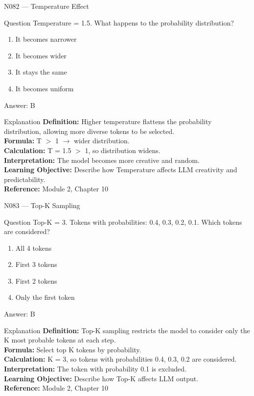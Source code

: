 \documentclass[aspectratio=169,8pt]{beamer}
\begin{document}
	\begin{frame}{N082 --- Temperature Effect}
		\begin{block}{Question}
			Temperature = 1.5. What happens to the probability distribution?
			\begin{enumerate}
				\item It becomes narrower
				\item It becomes wider
				\item It stays the same
				\item It becomes uniform
			\end{enumerate}
		\end{block}
		\begin{exampleblock}{Answer: B}\end{exampleblock}
		\begin{block}{Explanation}
			\textbf{Definition:} Higher temperature flattens the probability distribution, allowing more diverse tokens to be selected.\\
			\textbf{Formula:} T $>$ 1 $\rightarrow$ wider distribution.\\
			\textbf{Calculation:} T = 1.5 $>$ 1, so distribution widens.\\
			\textbf{Interpretation:} The model becomes more creative and random.\\
			\textbf{Learning Objective:} Describe how Temperature affects LLM creativity and predictability.\\
			\textbf{Reference:} Module 2, Chapter 10
		\end{block}
	\end{frame}
	
	\begin{frame}{N083 --- Top-K Sampling}
		\begin{block}{Question}
			Top-K = 3. Tokens with probabilities: 0.4, 0.3, 0.2, 0.1. Which tokens are considered?
			\begin{enumerate}
				\item All 4 tokens
				\item First 3 tokens
				\item First 2 tokens
				\item Only the first token
			\end{enumerate}
		\end{block}
		\begin{exampleblock}{Answer: B}\end{exampleblock}
		\begin{block}{Explanation}
			\textbf{Definition:} Top-K sampling restricts the model to consider only the K most probable tokens at each step.\\
			\textbf{Formula:} Select top K tokens by probability.\\
			\textbf{Calculation:} K = 3, so tokens with probabilities 0.4, 0.3, 0.2 are considered.\\
			\textbf{Interpretation:} The token with probability 0.1 is excluded.\\
			\textbf{Learning Objective:} Describe how Top-K affects LLM output.\\
			\textbf{Reference:} Module 2, Chapter 10
		\end{block}
	\end{frame}
	
\end{document}
